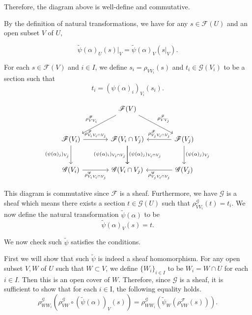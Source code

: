\documentclass{article}
\begin{document}
Therefore, the diagram above is well-define and commutative. \\
\par By the definition of natural transformations, we have for any $s\in\mathcal{F}(U)$ and an open subset $V$ of $U$, 

\begin{equation*}
\tilde{\psi}(\alpha)_U(s)|_V = \tilde{\psi}(\alpha)_V(s|_V).
\end{equation*}

\par For each $s\in\mathcal{F}(V)$ and $i\in I$, we define $s_i=\rho_{VV_i}(s)$ and $t_i\in\mathcal{G}(V_i)$ to be a section such that
\begin{equation*}
t_i = (\psi(\alpha)_i)_{V_i}(s_i).
\end{equation*}

\[ \begin{tikzcd}[row sep=large, column sep=large]
{}&\mathcal{F}(V)\arrow{ld}[swap]{\rho^{\mathcal{F}}_{VV_i}}\arrow{rd}{\rho^{\mathcal{F}}_{VV_j}}\\%
\mathcal{F}(V_i) \arrow{r}{\rho^{\mathcal{F}}_{V_iV_i\cap V_j}} \arrow[swap]{d}{(\psi(\alpha)_j)_{V_j}} & \mathcal{F}(V_i\cap V_j) \arrow{d}[swap]{(\psi(\alpha)_i)_{V_i\cap V_j}} \arrow{d}{(\psi(\alpha)_j)_{V_i\cap V_j}}&\arrow{l}[swap]{\rho^{\mathcal{F}}_{V_jV_i\cap V_j}} \mathcal{F}(V_j)\arrow{d}{(\psi(\alpha)_j)_{V_j}}\\%
\mathcal{G}(V_i) \arrow{r}[swap]{\rho^{\mathcal{G}}_{V_iV_i\cap V_j}} & \mathcal{G}(V_i\cap V_j)&\arrow{l}{\rho^{\mathcal{G}}_{V_jV_i\cap V_j}} \mathcal{G}(V_j)
\end{tikzcd}
\]

This diagram is commutative since $\mathcal{F}$ is a sheaf. Furthermore, we have $\mathcal{G}$ is a sheaf which means there exists a section $t\in\mathcal{G}(U)$ such that $\rho^{\mathcal{G}}_{VV_i}(t)=t_i$. We now define the natural transformation $\tilde{\psi}(\alpha)$ to be
\begin{equation*}
\tilde{\psi}(\alpha)_V(s) = t.
\end{equation*}

We now check such $\tilde{\psi}$ satisfies the conditions.\\
\par First we will show that such $\tilde{\psi}$ is indeed a sheaf homomorphism. For any open subset $V,W$ of $U$ such that $W\subset V$, we define $\{W_i\}_{i\in I}$ to be $W_i=W\cap U$ for each $i\in I$. Then this is an open cover of $W$. Therefore, since $\mathcal{G}$ is a sheaf, it is sufficient to show that for each $i\in $I, the following equality holds.
\begin{equation*}
\rho^{\mathcal{G}}_{WW_i}(\rho^{\mathcal{G}}_{VW}\circ(\tilde{\psi}(\alpha))_V(s))=\rho^{\mathcal{G}}_{WW_i}(\tilde{\psi}_{W}(\rho^{\mathcal{F}}_{VW}(s))).
\end{equation*}
\end{document}
